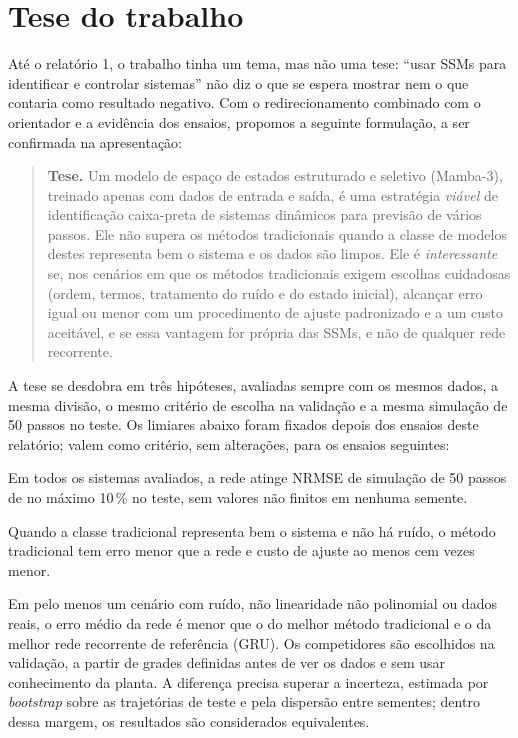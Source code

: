 \documentclass[11pt,a4paper]{article}
\begin{document}
\section{Tese do trabalho}\label{sec:tese}

Até o relatório 1, o trabalho tinha um tema, mas não uma tese: ``usar SSMs para identificar e
controlar sistemas'' não diz o que se espera mostrar nem o que contaria como resultado negativo.
Com o redirecionamento combinado com o orientador e a evidência dos ensaios, propomos a seguinte
formulação, a ser confirmada na apresentação:

\begin{quote}
\textbf{Tese.} Um modelo de espaço de estados estruturado e seletivo (Mamba-3), treinado apenas com
dados de entrada e saída, é uma estratégia \emph{viável} de identificação caixa-preta de sistemas
dinâmicos para previsão de vários passos. Ele não supera os métodos tradicionais quando a classe de
modelos destes representa bem o sistema e os dados são limpos. Ele é \emph{interessante} se, nos
cenários em que os métodos tradicionais exigem escolhas cuidadosas (ordem, termos, tratamento do
ruído e do estado inicial), alcançar erro igual ou menor com um procedimento de ajuste padronizado e
a um custo aceitável, e se essa vantagem for própria das SSMs, e não de qualquer rede recorrente.
\end{quote}

A tese se desdobra em três hipóteses, avaliadas sempre com os mesmos dados, a mesma divisão, o mesmo
critério de escolha na validação e a mesma simulação de 50 passos no teste. Os limiares abaixo foram
fixados depois dos ensaios deste relatório; valem como critério, sem alterações, para os ensaios
seguintes:
\begin{description}\itemsep0pt
  \item[H1 -- viabilidade.] Em todos os sistemas avaliados, a rede atinge NRMSE de simulação de 50
  passos de no máximo 10\,\% no teste, sem valores não finitos em nenhuma semente.
  \item[H2 -- limite.] Quando a classe tradicional representa bem o sistema e não há ruído, o método
  tradicional tem erro menor que a rede e custo de ajuste ao menos cem vezes menor.
  \item[H3 -- interesse.] Em pelo menos um cenário com ruído, não linearidade não polinomial ou dados
  reais, o erro médio da rede é menor que o do melhor método tradicional e o da melhor rede recorrente
  de referência (GRU). Os competidores são escolhidos na validação, a partir de grades definidas antes
  de ver os dados e sem usar conhecimento da planta. A diferença precisa superar a incerteza, estimada
  por \emph{bootstrap} sobre as trajetórias de teste e pela dispersão entre sementes; dentro dessa
  margem, os resultados são considerados equivalentes.
\end{description}
\end{document}
